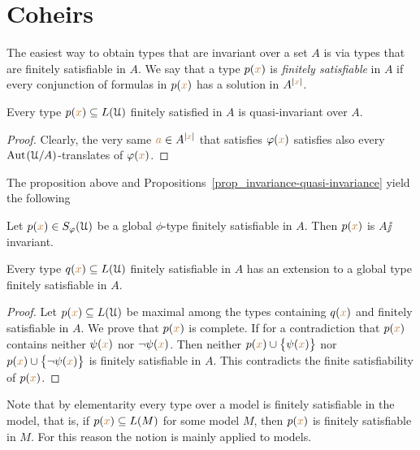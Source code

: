 \documentclass[creche.tex]{subfiles}
\begin{document}
\section{Coheirs}

The easiest way to obtain types that are invariant over a set $A$ is via types that are finitely satisfiable in $A$.
We say that a type $p({\color{brown} x})$ is  \emph{finitely satisfiable\/} in $A$ if every conjunction of formulas in $p({\color{brown} x})$ has a solution in $A^{|{\color{brown} x}|}$.

\begin{proposition}\label{prop_coeredi_quasiinvarienti}
Every type $p({\color{brown} x})\subseteq L(\EuScript U)$ finitely satisfied in $A$ is quasi-invariant over $A$.

\end{proposition}

\begin{proof}
Clearly, the very same ${\color{brown} a}\in A^{|{\color{brown} x}|}$ that satisfies $\varphi({\color{brown} x})$ satisfies also every $\textrm{Aut\kern.15ex}(\EuScript U/A)$-translates of $\varphi({\color{brown} x})$.
\end{proof}

The proposition above and Propositions~\ref{prop_invariance-quasi-invariance} yield the following

\begin{proposition}\label{prop_coeredi_invarienti}
Let $p({\color{brown} x})\in S_{\varphi}(\EuScript U)$ be a global $\phi$-type finitely satisfiable in $A$.
Then $p({\color{brown} x})$ is $A\jj$in\-vari\-ant.\QED
\end{proposition}

\begin{proposition}\label{prop_exisntence_coheirs}
Every type $q({\color{brown} x})\subseteq L(\EuScript U)$ finitely satisfiable in $A$ has an extension to a global type finitely satisfiable in $A$.
\end{proposition}

\begin{proof} 
Let $p({\color{brown} x})\subseteq L(\EuScript U)$ be maximal among the types containing $q({\color{brown} x})$ and finitely satisfiable in $A$.
We prove that $p({\color{brown} x})$ is complete.
If for a contradiction that $p({\color{brown} x})$ contains neither $\psi({\color{brown} x})$ nor $\neg\psi({\color{brown} x})$.
Then  neither $p({\color{brown} x})\cup\big\{\psi({\color{brown} x})\big\}$ nor $p({\color{brown} x})\cup\big\{\neg\psi({\color{brown} x})\big\}$ is finitely satisfiable in $A$.
This contradicts the finite satisfiability of $p({\color{brown} x})$.
\end{proof}

Note that by elementarity every type over a model is finitely satisfiable in the model, that is, if $p({\color{brown} x})\subseteq L(M)$ for some model $M$, then $p({\color{brown} x})$ is finitely satisfiable in $M$.
For this reason the notion is mainly applied to models.
\end{document}
